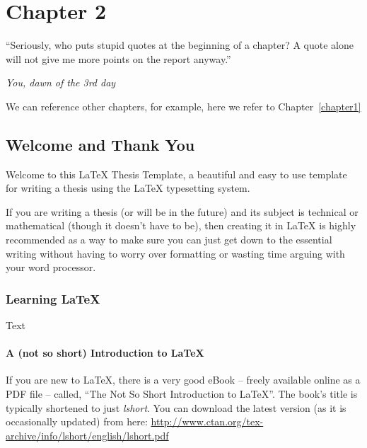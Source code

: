 
\chapter{Chapter 2} %

\label{chapter2} %

\epigraph{``Seriously, who puts stupid quotes at the beginning of a chapter? A quote alone will not give me more points on the report anyway.''}{\textit{You, dawn of the 3rd day}}

We can reference other chapters, for example, here we refer to Chapter~\ref{chapter1}

\section{Welcome and Thank You}
Welcome to this \LaTeX{} Thesis Template, a beautiful and easy to use template for writing a thesis using the \LaTeX{} typesetting system.

If you are writing a thesis (or will be in the future) and its subject is technical or mathematical (though it doesn't have to be), then creating it in \LaTeX{} is highly recommended as a way to make sure you can just get down to the essential writing without having to worry over formatting or wasting time arguing with your word processor.

\subsection{Learning \LaTeX{}}
Text

\subsubsection{A (not so short) Introduction to \LaTeX{}}

If you are new to \LaTeX{}, there is a very good eBook -- freely available online as a PDF file -- called, \enquote{The Not So Short Introduction to \LaTeX{}}. The book's title is typically shortened to just \emph{lshort}.
You can download the latest version (as it is occasionally updated) from here:
\url{http://www.ctan.org/tex-archive/info/lshort/english/lshort.pdf}
